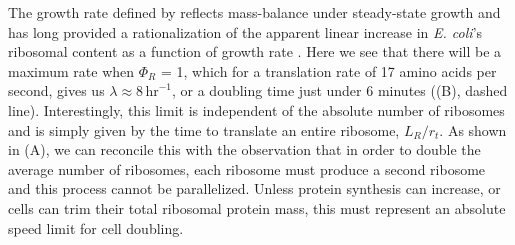 The growth rate defined by  reflects
mass-balance under steady-state growth and has long provided a rationalization
of the apparent linear increase in \textit{E. coli}'s ribosomal content as a
function of growth rate \citep{goldberger1979, scott2010}. Here we see that
there will be a maximum rate when $\Phi_R$ = 1, which for a translation rate of
17 amino acids per second, gives us $\lambda \approx 8 \,\text{hr}^{-1}$, or a
doubling time just under 6 minutes ((B), dashed line).
Interestingly, this limit is independent of the absolute number of ribosomes and
is simply given by the time to translate an entire ribosome, $L_R/ r_t$. As
shown in (A), we can reconcile this with the observation
that in order to double the average number of ribosomes, each ribosome must
produce a second ribosome and this process cannot be parallelized. Unless
protein synthesis can increase, or cells can trim their total ribosomal protein
mass, this must represent an absolute speed limit for cell doubling.


